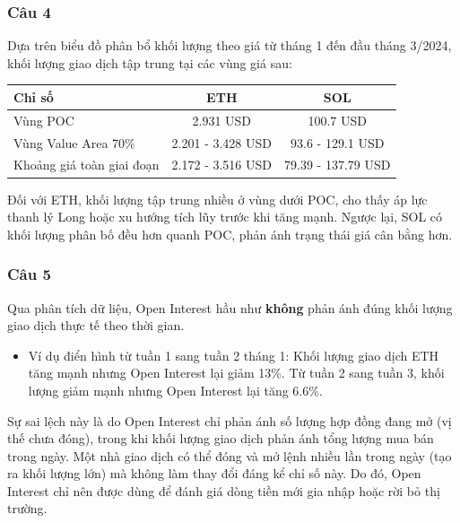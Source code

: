 \subsubsection{Câu 4}
Dựa trên biểu đồ phân bổ khối lượng theo giá từ tháng 1 đến đầu tháng 3/2024, khối lượng giao dịch tập trung tại các vùng giá sau:
\begin{table}[h]
\centering
\begin{tabular}{|l|c|c|}
\hline
\textbf{Chỉ số} & \textbf{ETH} & \textbf{SOL} \\ \hline
Vùng POC & 2.931 USD & 100.7 USD \\ \hline
Vùng Value Area 70\% & 2.201 - 3.428 USD & 93.6 - 129.1 USD \\ \hline
Khoảng giá toàn giai đoạn & 2.172 - 3.516 USD & 79.39 - 137.79 USD \\ \hline
\end{tabular}
\end{table}
Đối với ETH, khối lượng tập trung nhiều ở vùng dưới POC, cho thấy áp lực thanh lý Long hoặc xu hướng tích lũy trước khi tăng mạnh. Ngược lại, SOL có khối lượng phân bố đều hơn quanh POC, phản ánh trạng thái giá cân bằng hơn.

\subsubsection{Câu 5}
Qua phân tích dữ liệu, Open Interest hầu như \textbf{không} phản ánh đúng khối lượng giao dịch thực tế theo thời gian.
\begin{itemize}
    \item Ví dụ điển hình từ tuần 1 sang tuần 2 tháng 1: Khối lượng giao dịch ETH tăng mạnh nhưng Open Interest lại giảm 13\%. Từ tuần 2 sang tuần 3, khối lượng giảm mạnh nhưng Open Interest lại tăng 6.6\%.
\end{itemize}
Sự sai lệch này là do Open Interest chỉ phản ánh số lượng hợp đồng đang mở (vị thế chưa đóng), trong khi khối lượng giao dịch phản ánh tổng lượng mua bán trong ngày. Một nhà giao dịch có thể đóng và mở lệnh nhiều lần trong ngày (tạo ra khối lượng lớn) mà không làm thay đổi đáng kể chỉ số này. Do đó, Open Interest chỉ nên được dùng để đánh giá dòng tiền mới gia nhập hoặc rời bỏ thị trường.

